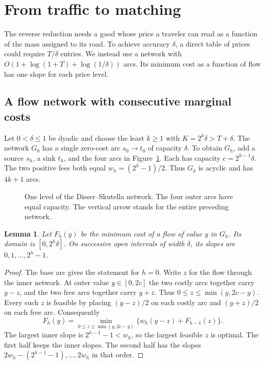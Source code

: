 \documentclass[11pt]{article}
\newtheorem{lemma}[theorem]{Lemma}
\begin{document}
\section{From traffic to matching}\label{sec:device}

The reverse reduction needs a good whose price a traveler can read as a
function of the mass assigned to its road. To achieve accuracy \(\delta\),
a direct table of prices could require \(T/\delta\) entries. We instead
use a network with \(O(1+\log(1+T)+\log(1/\delta))\) arcs. Its minimum
cost as a function of flow has one slope for each price level.

\subsection{A flow network with consecutive marginal costs}

Let \(0<\delta\le1\) be dyadic and choose the least \(k\ge1\) with
\(K=2^k\delta>T+\delta\). The network \(G_0\) has a single zero-cost arc
\(s_0\to t_0\) of capacity \(\delta\). To obtain \(G_h\), add a source
\(s_h\), a sink \(t_h\), and the four arcs in Figure~\ref{fig:count}.
Each has capacity \(c=2^{h-1}\delta\). The two positive fees both equal
\(w_h=(2^h-1)/2\). Thus \(G_k\) is acyclic and has \(4k+1\) arcs.

\begin{figure}[ht]
\centering
{}
\caption{One level of the Disser--Skutella network. The four outer arcs
have equal capacity. The vertical arrow stands for the entire preceding
network.}\label{fig:count}
\end{figure}

\begin{lemma}\label{lem:slopes}
Let \(F_h(y)\) be the minimum cost of a flow of value \(y\) in \(G_h\).
Its domain is \([0,2^h\delta]\). On successive open intervals of width
\(\delta\), its slopes are \(0,1,\ldots,2^h-1\).
\end{lemma}
\begin{proof}
The base arc gives the statement for \(h=0\). Write \(z\) for the flow
through the inner network. At outer value \(y\in[0,2c]\) the two costly
arcs together carry \(y-z\), and the two free arcs together carry \(y+z\).
Thus \(0\le z\le\min(y,2c-y)\). Every such \(z\) is feasible by placing
\((y-z)/2\) on each costly arc and \((y+z)/2\) on each free arc.
Consequently
\[
 F_h(y)=\min_{0\le z\le\min(y,2c-y)}
             \{w_h(y-z)+F_{h-1}(z)\}.
\]
The largest inner slope is \(2^{h-1}-1<w_h\), so the largest feasible \(z\)
is optimal. The first half keeps the inner slopes. The second half has the
slopes \(2w_h-(2^{h-1}-1),\ldots,2w_h\) in that order.
\end{proof}
\end{document}
